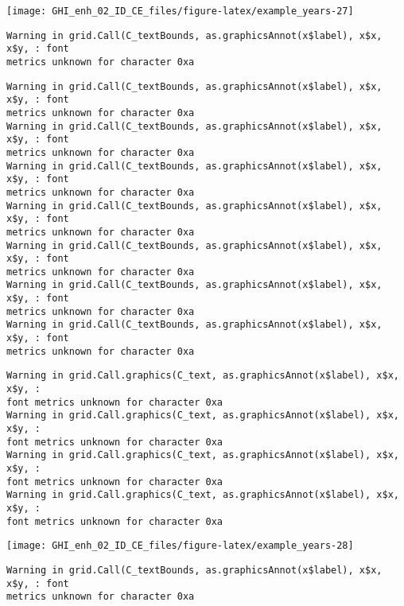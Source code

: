 \documentclass[
  10pt,
  a4paper,oneside]{article}
\begin{document}
\begin{center}\texttt{[image: GHI\_enh\_02\_ID\_CE\_files/figure-latex/example\_years-27]} \end{center}

\begin{verbatim}
Warning in grid.Call(C_textBounds, as.graphicsAnnot(x$label), x$x, x$y, : font
metrics unknown for character 0xa
\end{verbatim}

\begin{verbatim}
Warning in grid.Call(C_textBounds, as.graphicsAnnot(x$label), x$x, x$y, : font
metrics unknown for character 0xa
Warning in grid.Call(C_textBounds, as.graphicsAnnot(x$label), x$x, x$y, : font
metrics unknown for character 0xa
Warning in grid.Call(C_textBounds, as.graphicsAnnot(x$label), x$x, x$y, : font
metrics unknown for character 0xa
Warning in grid.Call(C_textBounds, as.graphicsAnnot(x$label), x$x, x$y, : font
metrics unknown for character 0xa
Warning in grid.Call(C_textBounds, as.graphicsAnnot(x$label), x$x, x$y, : font
metrics unknown for character 0xa
Warning in grid.Call(C_textBounds, as.graphicsAnnot(x$label), x$x, x$y, : font
metrics unknown for character 0xa
Warning in grid.Call(C_textBounds, as.graphicsAnnot(x$label), x$x, x$y, : font
metrics unknown for character 0xa
\end{verbatim}

\begin{verbatim}
Warning in grid.Call.graphics(C_text, as.graphicsAnnot(x$label), x$x, x$y, :
font metrics unknown for character 0xa
Warning in grid.Call.graphics(C_text, as.graphicsAnnot(x$label), x$x, x$y, :
font metrics unknown for character 0xa
Warning in grid.Call.graphics(C_text, as.graphicsAnnot(x$label), x$x, x$y, :
font metrics unknown for character 0xa
Warning in grid.Call.graphics(C_text, as.graphicsAnnot(x$label), x$x, x$y, :
font metrics unknown for character 0xa
\end{verbatim}

\begin{center}\texttt{[image: GHI\_enh\_02\_ID\_CE\_files/figure-latex/example\_years-28]} \end{center}

\begin{verbatim}
Warning in grid.Call(C_textBounds, as.graphicsAnnot(x$label), x$x, x$y, : font
metrics unknown for character 0xa
\end{verbatim}
\end{document}
